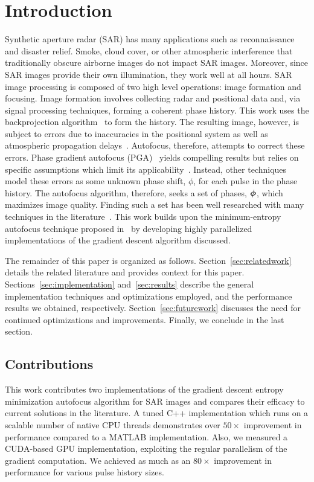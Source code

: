 \section{Introduction}\label{sec:introduction}

Synthetic aperture radar (SAR) has many applications such as reconnaissance and
disaster relief. Smoke, cloud cover, or other atmospheric interference that
traditionally obscure airborne images do not impact SAR images. Moreover, since
SAR images provide their own illumination, they work well at all hours.  SAR
image processing is composed of two high level operations: image formation and
focusing. Image formation involves collecting radar and positional data and, via
signal processing techniques, forming a coherent phase history.  This work
uses the backprojection algorithm~\cite{bp} to form the history. The resulting
image, however, is subject to errors due to inaccuracies in the positional
system as well as atmospheric propagation delays~\cite{ash2012autofocus}.
Autofocus, therefore, attempts to correct these errors. Phase gradient autofocus
(PGA)~\cite{wahl1994phase} yields compelling results but relies on specific
assumptions which limit its applicability~\cite{ash2012autofocus}. Instead,
other techniques model these errors as some unknown phase shift,
$\phi$, for each pulse in the phase history.  The autofocus algorithm,
therefore, seeks a set of phases, $\bm{\phi}$, which maximizes image quality.
Finding such a set has been well researched with many techniques in the
literature~\cite{kragh2006monotonic, ash2012autofocus, kragh2009minimum,
morrison2007sar, Eichel:89, less_mem_high_eff_autofocus}.  This work builds upon
the minimum-entropy autofocus technique proposed in~\cite{kragh2006monotonic} by
developing highly parallelized implementations of the gradient descent algorithm
discussed.

The remainder of this paper is organized as follows.
Section~\ref{sec:relatedwork} details the related literature and provides
context for this paper. Sections~\ref{sec:implementation} and~\ref{sec:results}
describe the general implementation techniques and optimizations employed, and
the performance results we obtained, respectively. Section~\ref{sec:futurework}
discusses the need for continued optimizations and improvements. Finally, we
conclude in the last section.

\subsection{Contributions}

This work contributes two implementations of the gradient descent entropy
minimization autofocus algorithm for SAR images and compares their efficacy to
current solutions in the literature. A tuned C++ implementation which runs on a
scalable number of native CPU threads demonstrates over $50\times$ improvement in
performance compared to a MATLAB implementation. Also, we measured a CUDA-based
GPU implementation, exploiting the regular parallelism of the gradient
computation. We achieved as much as an $80\times$ improvement in performance
for various pulse history sizes.
